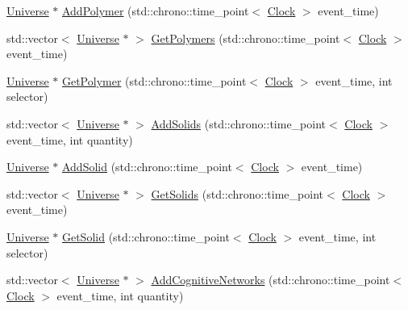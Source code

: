 \begin{DoxyCompactItemize}
\item 
\mbox{\hyperlink{class_universe}{Universe}} $\ast$ \mbox{\hyperlink{class_universe_a4ea0af5d2eb7b5070a83f7da29526fbd}{Add\+Polymer}} (std\+::chrono\+::time\+\_\+point$<$ \mbox{\hyperlink{universe_8h_a0ef8d951d1ca5ab3cfaf7ab4c7a6fd80}{Clock}} $>$ event\+\_\+time)
\item 
std\+::vector$<$ \mbox{\hyperlink{class_universe}{Universe}} $\ast$ $>$ \mbox{\hyperlink{class_universe_aac5d1c1a3a3ba56c8ca7115a85b2c239}{Get\+Polymers}} (std\+::chrono\+::time\+\_\+point$<$ \mbox{\hyperlink{universe_8h_a0ef8d951d1ca5ab3cfaf7ab4c7a6fd80}{Clock}} $>$ event\+\_\+time)
\item 
\mbox{\hyperlink{class_universe}{Universe}} $\ast$ \mbox{\hyperlink{class_universe_a2d5d3924a7d7ffd2a5f47be9f137d86e}{Get\+Polymer}} (std\+::chrono\+::time\+\_\+point$<$ \mbox{\hyperlink{universe_8h_a0ef8d951d1ca5ab3cfaf7ab4c7a6fd80}{Clock}} $>$ event\+\_\+time, int selector)
\item 
std\+::vector$<$ \mbox{\hyperlink{class_universe}{Universe}} $\ast$ $>$ \mbox{\hyperlink{class_universe_a410d5ba2224fe90584b1f1aa5b38b41c}{Add\+Solids}} (std\+::chrono\+::time\+\_\+point$<$ \mbox{\hyperlink{universe_8h_a0ef8d951d1ca5ab3cfaf7ab4c7a6fd80}{Clock}} $>$ event\+\_\+time, int quantity)
\item 
\mbox{\hyperlink{class_universe}{Universe}} $\ast$ \mbox{\hyperlink{class_universe_a598799e2fcdf9ed60e83e9f5a61bfc05}{Add\+Solid}} (std\+::chrono\+::time\+\_\+point$<$ \mbox{\hyperlink{universe_8h_a0ef8d951d1ca5ab3cfaf7ab4c7a6fd80}{Clock}} $>$ event\+\_\+time)
\item 
std\+::vector$<$ \mbox{\hyperlink{class_universe}{Universe}} $\ast$ $>$ \mbox{\hyperlink{class_universe_a669fc068dd7820a5af309bfbe67199aa}{Get\+Solids}} (std\+::chrono\+::time\+\_\+point$<$ \mbox{\hyperlink{universe_8h_a0ef8d951d1ca5ab3cfaf7ab4c7a6fd80}{Clock}} $>$ event\+\_\+time)
\item 
\mbox{\hyperlink{class_universe}{Universe}} $\ast$ \mbox{\hyperlink{class_universe_a9f7b74fc21d45ddaa78aa18e9a337bcd}{Get\+Solid}} (std\+::chrono\+::time\+\_\+point$<$ \mbox{\hyperlink{universe_8h_a0ef8d951d1ca5ab3cfaf7ab4c7a6fd80}{Clock}} $>$ event\+\_\+time, int selector)
\item 
std\+::vector$<$ \mbox{\hyperlink{class_universe}{Universe}} $\ast$ $>$ \mbox{\hyperlink{class_universe_a5199f6c27b1a97c8b8c9847b8be686cf}{Add\+Cognitive\+Networks}} (std\+::chrono\+::time\+\_\+point$<$ \mbox{\hyperlink{universe_8h_a0ef8d951d1ca5ab3cfaf7ab4c7a6fd80}{Clock}} $>$ event\+\_\+time, int quantity)

\end{DoxyCompactItemize}
